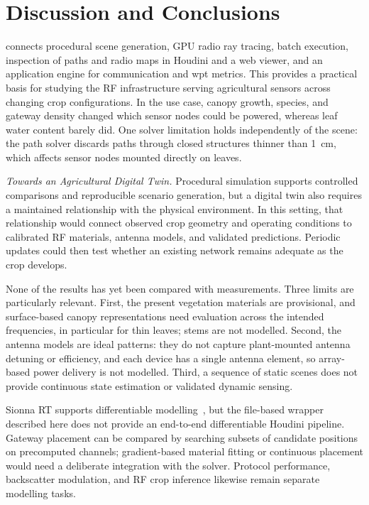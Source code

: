 \section{Discussion and Conclusions}
\label{sec:conclusion}
\housionna{} connects procedural scene generation, GPU radio ray tracing, batch execution, inspection of paths and radio maps in Houdini and a web viewer, and an application engine for communication and \gls{wpt} metrics. This provides a practical basis for studying the RF infrastructure serving agricultural sensors across changing crop configurations. In the use case, canopy growth, species, and gateway density changed which sensor nodes could be powered, whereas leaf water content barely did. One solver limitation holds independently of the scene: the path solver discards paths through closed structures thinner than \SI{1}{cm}, which affects sensor nodes mounted directly on leaves.

\emph{Towards an Agricultural Digital Twin. }\label{sec:twin}
Procedural simulation supports controlled comparisons and reproducible scenario generation, but a digital twin also requires a maintained relationship with the physical environment. In this setting, that relationship would connect observed crop geometry and operating conditions to calibrated RF materials, antenna models, and validated predictions. Periodic updates could then test whether an existing network remains adequate as the crop develops.

None of the results has yet been compared with measurements. Three limits are particularly relevant. First, the present vegetation materials are provisional, and surface-based canopy representations need evaluation across the intended frequencies, in particular for thin leaves; stems are not modelled. Second, the antenna models are ideal patterns: they do not capture plant-mounted antenna detuning or efficiency, and each device has a single antenna element, so array-based power delivery is not modelled. Third, a sequence of static scenes does not provide continuous state estimation or validated dynamic sensing.

Sionna RT supports differentiable modelling~\cite{hoydis2023,aoudia2025}, but the file-based wrapper described here does not provide an end-to-end differentiable Houdini pipeline. Gateway placement can be compared by searching subsets of candidate positions on precomputed channels; gradient-based material fitting or continuous placement would need a deliberate integration with the solver. Protocol performance, backscatter modulation, and RF crop inference likewise remain separate modelling tasks.

